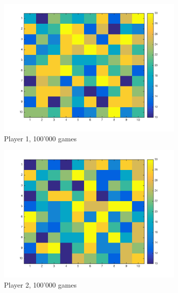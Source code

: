 \documentclass[11pt]{article}
\begin{document}
\begin{figure}[h]
	\centering
	\begin{subfigure}[b]{0.4\textwidth}
		\includegraphics[width=\textwidth]{player_1_best_strategies_V2}
		\caption{Player 1, 100'000 games}
		\label{p1 best strat v2.1}
	\end{subfigure}
	\begin{subfigure}[b]{0.4\textwidth}
		\includegraphics[width=\textwidth]{player_2_best_strategies_V2}
		\caption{Player 2, 100'000 games}
		\label{p2 best strat v2.1}
	\end{subfigure}
	\begin{subfigure}[b]{0.4\textwidth}

\end{subfigure}
\end{figure}
\end{document}
